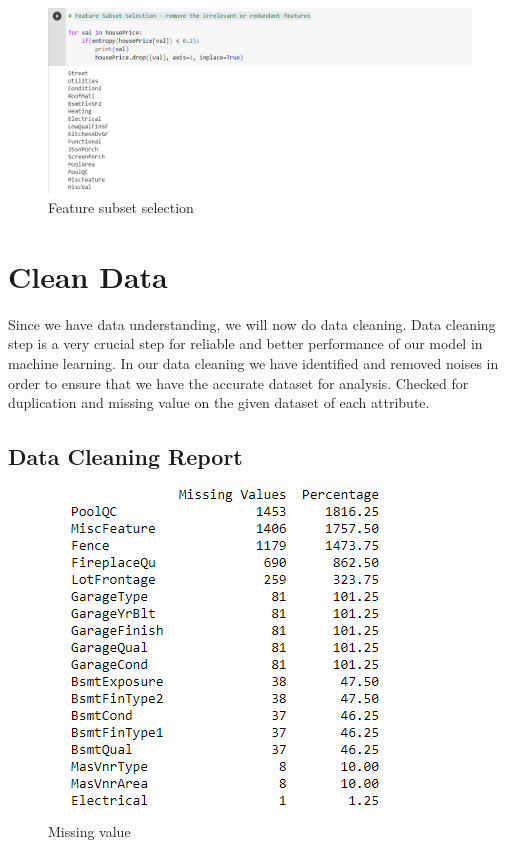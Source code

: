 \begin{figure}[t]
    \includegraphics[scale=0.45]{imgs/feature_subset_selection.png}
    \centering
    \caption{Feature subset selection}
    \hrulefill\vspace{15pt}\par
\end{figure}

\section{Clean Data}

Since we have data understanding, we will now do data cleaning.  Data cleaning step is a very crucial step for reliable and better performance of our model in machine learning. In our data cleaning we have identified and removed noises in order to ensure that we have the accurate dataset for analysis. Checked for duplication and missing value on the given dataset of each attribute. 

\subsection{Data Cleaning Report}

\begin{figure}[t]
    \includegraphics[scale=0.55]{imgs/missing_value.png}
    \centering
    \caption{Missing value}
    \hrulefill\vspace{15pt}\par
\end{figure}

